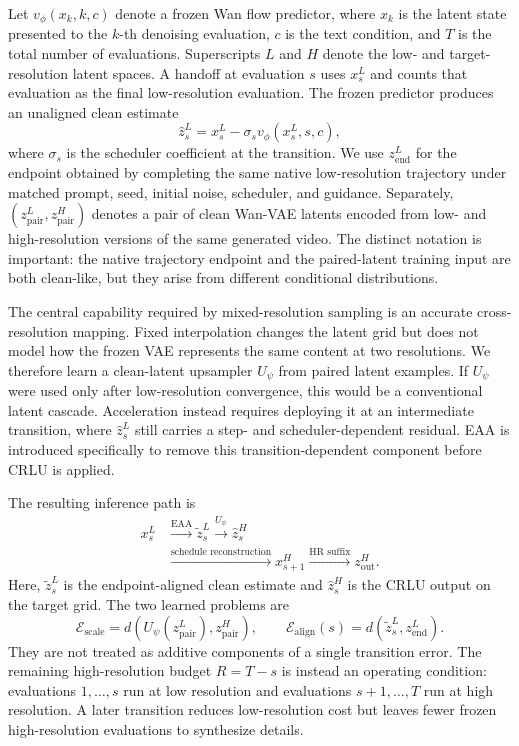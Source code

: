 Let \(v_\phi(x_k,k,c)\) denote a frozen Wan flow predictor, where \(x_k\)
is the latent state presented to the \(k\)-th denoising evaluation, \(c\) is
the text condition, and \(T\) is the total number of evaluations. Superscripts
\(L\) and \(H\) denote the low- and target-resolution latent spaces. A handoff
at evaluation \(s\) uses \(x_s^L\) and counts that evaluation as the final
low-resolution evaluation. The frozen predictor produces an
unaligned clean estimate
\[
\widehat z_s^L
=x_s^L-\sigma_s v_\phi(x_s^L,s,c),
\]
where \(\sigma_s\) is the scheduler coefficient at the transition. We use
\(z_{\mathrm{end}}^L\) for the endpoint obtained by completing the same
native low-resolution trajectory under matched prompt, seed, initial noise,
scheduler, and guidance. Separately,
\((z_{\mathrm{pair}}^L,z_{\mathrm{pair}}^H)\) denotes a pair of clean Wan-VAE
latents encoded from low- and high-resolution versions of the same generated
video. The distinct notation is important: the native trajectory endpoint and
the paired-latent training input are both clean-like, but they arise from
different conditional distributions.

The central capability required by mixed-resolution sampling is an accurate
cross-resolution mapping. Fixed interpolation changes the latent grid but does
not model how the frozen VAE represents the same content at two resolutions.
We therefore learn a clean-latent upsampler \(U_\psi\) from paired latent
examples. If \(U_\psi\) were used only after low-resolution convergence, this
would be a conventional latent cascade. Acceleration instead requires deploying
it at an intermediate transition, where \(\widehat z_s^L\) still carries a
step- and scheduler-dependent residual. EAA is introduced specifically to
remove this transition-dependent component before CRLU is applied. 

The resulting inference path is
\[
\begin{aligned}
x_s^L
&\xrightarrow{\text{EAA}}
\widetilde z_s^L
\xrightarrow{U_\psi}
\widehat z_s^H \\
&\xrightarrow{\text{schedule reconstruction}}
x_{s+1}^H
\xrightarrow{\text{HR suffix}}
z_{\mathrm{out}}^H.
\end{aligned}
\]
Here, \(\widetilde z_s^L\) is the endpoint-aligned clean estimate and
\(\widehat z_s^H\) is the CRLU output on the target grid. The two learned
problems are
\[
\mathcal E_{\mathrm{scale}}
=d\!\left(U_\psi(z_{\mathrm{pair}}^L),z_{\mathrm{pair}}^H\right),
\qquad
\mathcal E_{\mathrm{align}}(s)
=d\!\left(\widetilde z_s^L,z_{\mathrm{end}}^L\right).
\]
They are not treated as additive components of a single transition error. The
remaining high-resolution budget \(R=T-s\) is instead an operating condition:
evaluations \(1,\ldots,s\) run at low resolution and evaluations
\(s+1,\ldots,T\) run at high resolution. A later transition reduces
low-resolution cost but leaves fewer frozen high-resolution evaluations to
synthesize details.

